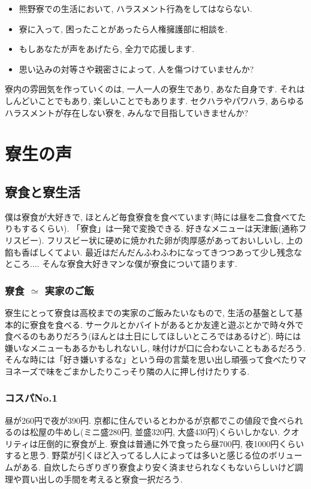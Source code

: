 \documentclass[10pt,b5jsbook,dvips,dvipdfmx,openany]{jsbook}
\theoremstyle{definition}
\begin{document}
\normalsize
		\begin{tcolorbox}
		\begin{itemize}
		\item 熊野寮での生活において, ハラスメント行為をしてはならない. 
		\item 寮に入って, 困ったことがあったら人権擁護部に相談を. 
		\item もしあなたが声をあげたら, 全力で応援します. 
		\item 思い込みの対等さや親密さによって, 人を傷つけていませんか? 
		\end{itemize}
		\end{tcolorbox}

		寮内の雰囲気を作っていくのは, 一人一人の寮生であり, あなた自身です. それはしんどいことでもあり, 楽しいことでもあります. セクハラやパワハラ, あらゆるハラスメントが存在しない寮を, みんなで目指していきませんか? 



\newpage

\chapter{寮生の声}

	\section{寮食と寮生活}

	僕は寮食が大好きで, ほとんど毎食寮食を食べています(時には昼を二食食べてたりもするくらい). 「寮食」は一発で変換できる. 好きなメニューは天津飯(通称フリスビー). フリスビー状に硬めに焼かれた卵が肉厚感があっておいしいし, 上の餡も香ばしくてよい. 最近はだんだんふわふわになってきつつあって少し残念なところ.... そんな寮食大好きマンな僕が寮食について語ります. 

		\subsection{寮食 $ \simeq $ 実家のご飯}
		寮生にとって寮食は高校までの実家のご飯みたいなもので, 生活の基盤として基本的に寮食を食べる. サークルとかバイトがあるとか友達と遊ぶとかで時々外で食べるのもありだろう(ほんとは土日にしてほしいところではあるけど). 時には嫌いなメニューもあるかもしれないし, 味付けが口に合わないこともあるだろう. そんな時には「好き嫌いするな」という母の言葉を思い出し頑張って食べたりマヨネーズで味をごまかしたりこっそり隣の人に押し付けたりする. 

		\subsection{コスパNo.1}
		昼が260円で夜が390円. 京都に住んでいるとわかるが京都でこの値段で食べられるのは松屋の牛めし(ミニ盛280円, 並盛320円, 大盛430円)くらいしかない. クオリティは圧倒的に寮食が上. 寮食は普通に外で食ったら昼700円, 夜1000円くらいすると思う. 野菜が引くほど入ってるし人によっては多いと感じる位のボリュームがある. 自炊したらぎりぎり寮食より安く済ませられなくもないらしいけど調理や買い出しの手間を考えると寮食一択だろう. 
\end{document}
